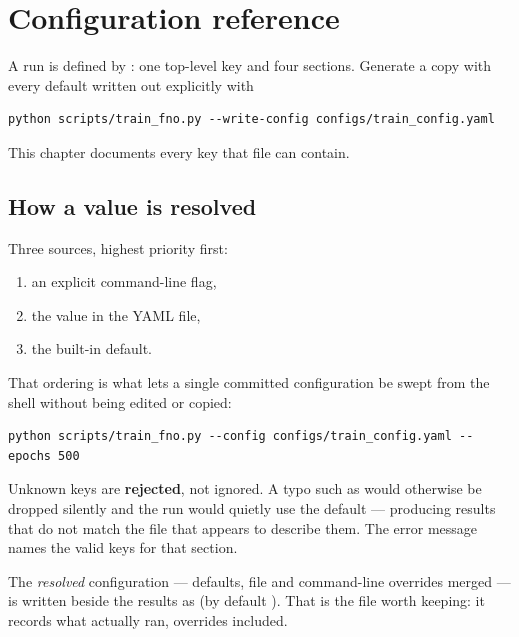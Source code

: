 \chapter{Configuration reference}
\label{ch:config}

A run is defined by : one top-level key and
four sections. Generate a copy with every default written out explicitly with

\begin{lstlisting}
python scripts/train_fno.py --write-config configs/train_config.yaml
\end{lstlisting}

This chapter documents every key that file can contain.

\section{How a value is resolved}

Three sources, highest priority first:

\begin{enumerate}
  \item an explicit command-line flag,
  \item the value in the YAML file,
  \item the built-in default.
\end{enumerate}

That ordering is what lets a single committed configuration be swept from the
shell without being edited or copied:

\begin{lstlisting}
python scripts/train_fno.py --config configs/train_config.yaml --epochs 500
\end{lstlisting}

\begin{pnote}
Unknown keys are \textbf{rejected}, not ignored. A typo such as
 would otherwise be dropped silently and the run would quietly
use the default --- producing results that do not match the file that appears
to describe them. The error message names the valid keys for that section.
\end{pnote}

The \emph{resolved} configuration --- defaults, file and command-line overrides
merged --- is written beside the results as 
(by default ). That is the file worth
keeping: it records what actually ran, overrides included.

